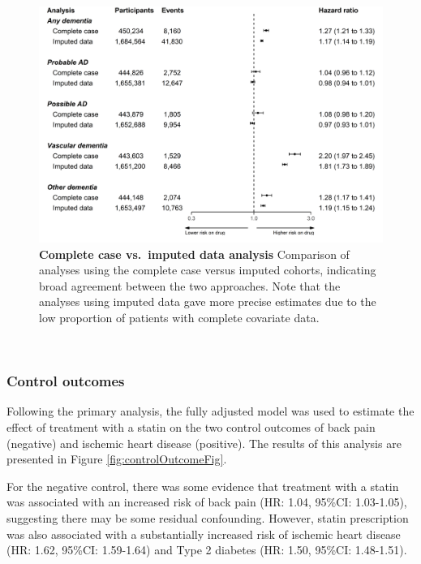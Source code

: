 \documentclass[a4paper, twoside]{templates/ociamthesis}
\begin{document}
~





\begin{figure}[H]
\includegraphics[width=1\linewidth]{figures/cprd-analysis/forester_complete_case} \caption[Complete case vs.~imputed data analysis]{\textbf{Complete case vs.~imputed data analysis} Comparison of analyses using the complete case versus imputed cohorts, indicating broad agreement between the two approaches. Note that the analyses using imputed data gave more precise estimates due to the low proportion of patients with complete covariate data.}\label{fig:completeCaseFig}
\end{figure}

~

\hypertarget{control-outcomes-1}{%
\subsubsection{Control outcomes}\label{control-outcomes-1}}

Following the primary analysis, the fully adjusted model was used to estimate the effect of treatment with a statin on the two control outcomes of back pain (negative) and ischemic heart disease (positive). The results of this analysis are presented in Figure \ref{fig:controlOutcomeFig}.

For the negative control, there was some evidence that treatment with a statin was associated with an increased risk of back pain (HR: 1.04, 95\%CI: 1.03-1.05), suggesting there may be some residual confounding. However, statin prescription was also associated with a substantially increased risk of ischemic heart disease (HR: 1.62, 95\%CI: 1.59-1.64) and Type 2 diabetes (HR: 1.50, 95\%CI: 1.48-1.51).
\end{document}
